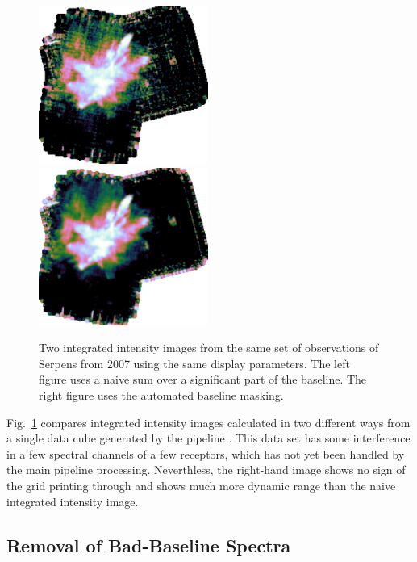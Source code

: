 \documentclass[final,authoryear,5p,times,twocolumn]{elsarticle}
\begin{document}
\begin{figure}[t]
\begin{minipage}{\textwidth}
\centering
\includegraphics[width=0.495\textwidth]{integ_manual.png}
\includegraphics[width=0.495\textwidth]{integ_auto.png}
\caption{Two integrated intensity images from the same set of
  observations of Serpens from 2007 using the same display
  parameters. The left figure uses a naive sum over a significant part
  of the baseline. The right figure uses the automated baseline
  masking.}
\label{fig:integ}
\end{minipage}
\end{figure}

Fig.\ \ref{fig:integ} compares integrated intensity images calculated
in two different ways from a single data cube generated by the
pipeline \citep[see][for details of earlier
reductions of these data]{2010MNRAS.409.1412G,2010A&A...523A..29D}. This data set
has some interference in a few spectral channels of a few receptors,
which has not yet been handled by the main pipeline
processing. Neverthless, the right-hand image shows no sign of the grid
printing through and shows much more dynamic range than the naive
integrated intensity image.

\subsection{Removal of Bad-Baseline Spectra}
\end{document}
